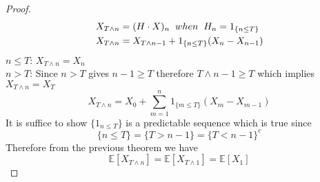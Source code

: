 \documentclass[a4paper,10pt,english]{article}
\begin{document}
\begin{proof}
\begin{align*}
    X_{T\wedge n}&= (H\cdot X)_n\hspace{2 mm} when\hspace{2 mm} H_n=1_{\{n\leq T\}}\\
    X_{T \wedge n}&= X_{T\wedge n-1}+1_{\{n \leq T\}}(X_n-X_{n-1})\\
\end{align*}
 $n\leq T$:\hspace{2 mm}  $X_{T\wedge n}= X_n$\\
 $n>T$: Since $n>T$ gives $n-1\geq T$ therefore $T\wedge n-1\geq T$ which implies $X_{T\wedge n}=X_{T}$ \\
 \begin{equation*}
     X_{T\wedge n}= X_0 +  \sum_{m=1}^{n} 1_{\{m\leq T\}}(X_m-X_{m-1})
 \end{equation*}
     It is suffice to show $\{1_{n\leq T}\}$ is a predictable sequence which is true since 
  \begin{equation*}
  \{n\leq T\}=\{T>n-1\}=\{T<n-1\}^c
  \end{equation*}
  Therefore from the previous theorem we have 
  \begin{equation*}
      \mathbb{E}[X_{T\wedge n}]=\mathbb{E}[X_{T\wedge 1}]=\mathbb{E}[X_{1}]
  \end{equation*}


\end{proof}
\end{document}

